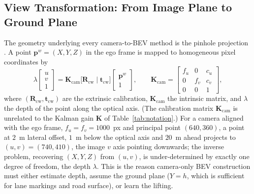 \documentclass[graybox,envcountchap]{style/SNmono}
\begin{document}
\subsection{View Transformation: From Image Plane to Ground Plane}
\label{subsec:view-transformation}
The geometry underlying every camera-to-BEV method is the pinhole projection \cite{hartley2003_mvg}. A point $\mathbf{p}^{w}=(X,Y,Z)$ in the ego frame is mapped to homogeneous pixel coordinates by
\begin{equation}
\lambda\begin{bmatrix}u\\ v\\ 1\end{bmatrix}
=\mathbf{K}_{\mathrm{cam}}\big[\mathbf{R}_{\mathrm{cw}}\;|\;\mathbf{t}_{\mathrm{cw}}\big]
\begin{bmatrix}\mathbf{p}^{w}\\ 1\end{bmatrix},\qquad
\mathbf{K}_{\mathrm{cam}}=\begin{bmatrix}f_u & 0 & c_u\\ 0 & f_v & c_v\\ 0&0&1\end{bmatrix},
\label{eq:pinhole}
\end{equation}
where $(\mathbf{R}_{\mathrm{cw}},\mathbf{t}_{\mathrm{cw}})$ are the extrinsic calibration, $\mathbf{K}_{\mathrm{cam}}$ the intrinsic matrix, and $\lambda$ the depth of the point along the optical axis. (The calibration matrix $\mathbf{K}_{\mathrm{cam}}$ is unrelated to the Kalman gain $\mathbf{K}$ of Table~\ref{tab:notation}.) For a camera aligned with the ego frame, $f_u=f_v=1000$~px and principal point $(640,360)$, a point at $2$~m lateral offset, $1$~m below the optical axis and $20$~m ahead projects to $(u,v)=(740,410)$, the image $v$ axis pointing downwards; the inverse problem, recovering $(X,Y,Z)$ from $(u,v)$, is under-determined by exactly one degree of freedom, the depth $\lambda$. This is the reason camera-only BEV construction must either estimate depth, assume the ground plane ($Y=h$, which is sufficient for lane markings and road surface), or learn the lifting.
\end{document}

